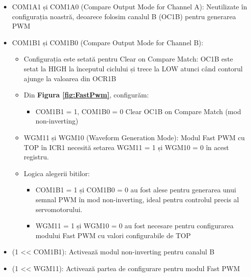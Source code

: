 \documentclass{report}
\begin{document}
\begin{itemize}
    \item COM1A1 și COM1A0 (Compare Output Mode for Channel A): Neutilizate în configurația noastră, deoarece folosim canalul B (OC1B) pentru generarea PWM
    \item COM1B1 și COM1B0 (Compare Output Mode for Channel B):
        \begin{itemize}
            \item Configurația este setată pentru Clear on Compare Match: OC1B este setat la HIGH la începutul ciclului și trece la LOW atunci când contorul ajunge la valoarea din OCR1B 
            \item Din \textbf{Figura \ref{fig:FastPwm}}, configurăm:
                \begin{itemize}
                    \item COM1B1 = 1, COM1B0 = 0   Clear OC1B on Compare Match (mod non-inverting)
                \end{itemize}
            \item WGM11 și WGM10 (Waveform Generation Mode): Modul Fast PWM cu TOP în ICR1 necesită setarea WGM11 = 1 și WGM10 = 0 în acest registru.
            \item Logica alegerii bitilor: 
            \begin{itemize}
                \item COM1B1 = 1 și COM1B0 = 0 au fost alese pentru generarea unui semnal PWM în mod non-inverting, ideal pentru controlul precis al servomotorului.
                \item WGM11 = 1 și WGM10 = 0 au fost necesare pentru configurarea modului Fast PWM cu valori configurabile de TOP
            \end{itemize}
            
        \end{itemize}
        \item (1 << COM1B1): Activează modul non-inverting pentru canalul B
        \item (1 << WGM11): Activează partea de configurare pentru modul Fast PWM
\end{itemize}
\end{document}
